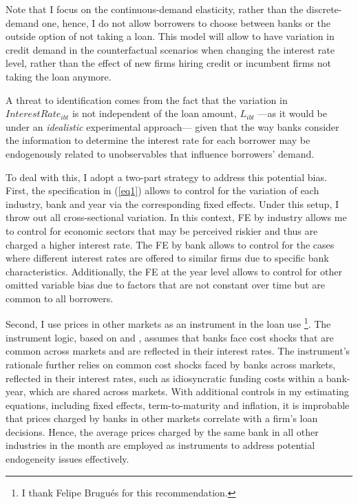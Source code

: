 \documentclass[11pt, oneside]{book}
\let\oldfootnote\footnote %
\renewcommand\footnote[1]{%
\oldfootnote{\hspace{0.05mm}#1}}
\begin{document}
Note that I focus on the continuous-demand elasticity, rather than the discrete-demand one, hence, I do not allow borrowers to choose between banks or the outside option of not taking a loan. This model will allow to have variation in credit demand in the
counterfactual scenarios when changing the interest rate level, rather than the effect of new firms hiring credit or incumbent firms not taking the loan anymore.

 
A threat to identification comes from the fact that the variation in $InterestRate_{ibt}$ is not independent of the loan amount, $L_{ibt}$ ---as it would be under an \textit{idealistic} experimental approach--- given that the way banks consider the information to determine the interest rate for each borrower may be endogenously related to unobservables that influence borrowers’ demand. 

To deal with this, I adopt a two-part strategy to address this potential bias. First, the specification in (\ref{eq1}) allows to control for the variation of each industry, bank and year via the corresponding fixed effects. Under this setup, I throw out all cross-sectional variation. In this context, FE by industry allows me to control for economic sectors that may be perceived riskier and thus are charged a higher interest rate. The FE by bank allows to control for the cases where different interest rates are offered to similar firms due to specific bank characteristics. Additionally, the FE at the year level allows to control for other omitted variable bias due to factors that are not constant over time but are common to all borrowers. 

Second,  I use prices in other markets as an instrument in the loan use\footnote{I thank Felipe Brugués for this recommendation.}.  The instrument logic, based on  \cite{hausman1996valuation} and \cite{crawford2018asymmetric}, assumes that banks face cost shocks that are common across markets and are reflected in their interest rates. The instrument's rationale further relies on common cost shocks faced by banks across markets, reflected in their interest rates, such as idiosyncratic funding costs within a bank-year, which are shared across markets. With additional controls  in my estimating equations, including fixed effects, term-to-maturity and inflation, it is improbable that prices charged by banks in other markets correlate with a firm's loan decisions. Hence, the average prices charged by the same bank in all other industries in the month are employed as instruments to address potential endogeneity issues effectively.
\end{document}
